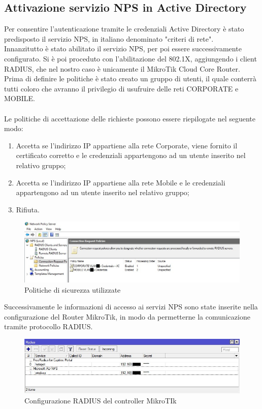 \documentclass[Realizzazione.tex]{subfiles}
\begin{document}
\subsection{Attivazione servizio NPS in Active Directory} 
Per consentire l'autenticazione tramite le credenziali Active Directory è stato predisposto il servizio NPS, in italiano denominato "criteri di rete". \\
Innanzitutto è stato abilitato il servizio NPS, per poi essere successivamente configurato. Si è poi proceduto con l'abilitazione del 802.1X, aggiungendo i client RADIUS, che nel nostro caso è unicamente il MikroTik Cloud Core Router.\\
Prima di definire le politiche è stato creato un gruppo di utenti, il quale conterrà tutti coloro che avranno il privilegio di usufruire delle reti CORPORATE e MOBILE. \\\\
Le politiche di accettazione delle richieste possono essere riepilogate nel seguente modo:
\begin{enumerate}
\item Accetta se l'indirizzo IP appartiene alla rete Corporate, viene fornito il certificato corretto e le credenziali appartengono ad un utente inserito nel relativo gruppo;
\item Accetta se l'indirizzo IP appartiene alla rete Mobile e le credenziali appartengono ad un utente inserito nel relativo gruppo;
\item Rifiuta.
\end{enumerate}

\begin{figure}[H]
	\centering
	\includegraphics[width=1\linewidth]{"images/nps_conf"}
	\caption{Politiche di sicurezza utilizzate}
	\label{fig:Politiche di sicurezza utilizzate}
\end{figure}


Successivamente le informazioni di accesso ai servizi NPS sono state inserite nella configurazione del Router MikroTik, in modo da permetterne la comunicazione tramite protocollo RADIUS.

\begin{figure}[H]
	\centering
	\includegraphics[width=1\linewidth]{"images/nps_miktorik"}
	\caption{Configurazione RADIUS del controller MikroTIk}
	\label{fig:Configurazione RADIUS del controller MikroTIk}
\end{figure}
\end{document}
